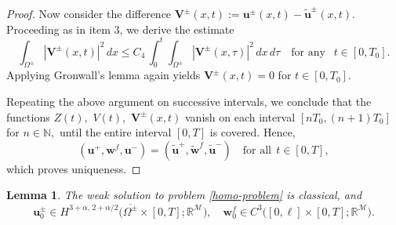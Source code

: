 \documentclass[reqno]{amsart}            %
\newtheorem{lemma}{Lemma}[section]
\numberwithin{equation}{section}
\begin{document}
\begin{proof}
		Now consider the difference
		$
		\mathbf{V}^\pm(x,t):= \mathbf{u}^\pm(x,t) - \tilde{\mathbf{u}}^\pm(x,t). 
		$
		Proceeding as in item 3, we derive the estimate
		\begin{equation*}%
			\int_{\Omega^\pm} |\mathbf{V}^\pm(x,t)|^2\, dx \le C_4 \, \int_{0}^{t}\int_{\Omega^\pm} |\mathbf{V}^\pm(x,\tau)|^2 \, dx\, d\tau  \quad \text{for any } \ \ t \in [0,T_0]. 
		\end{equation*}
		Applying Gronwall's lemma again yields   
		$\mathbf{V}^\pm(x,t) =0$ for  $t \in [0, T_0].$
		
		Repeating the above argument on successive intervals, we conclude that the functions $Z(t),$ $V(t),$ $\mathbf{V}^\pm(x,t)$ vanish on each interval $[nT_0, (n+1)T_0]$ for $n \in \mathbb{N},$ until the entire interval $[0,T]$ is covered.
		Hence, 
		$$
		(\mathbf{u}^+, \mathbf{w}^f, \mathbf{u}^-)
		= (\tilde{\mathbf{u}}^+, \tilde{\mathbf{w}}^f, \tilde{\mathbf{u}}^-) \quad \text{for all} \ \ t\in [0,T],
		$$ 
		which proves uniqueness. 
	\end{proof}
	
	\begin{lemma}\label{Th-4-4}
		The weak solution to problem \eqref{homo-problem} is classical, and 
		$$
		\mathbf{u}^\pm_0 \in H^{3+\alpha,\,2+\alpha/2}\big(\overline{\Omega^\pm}\times[0,T]; \mathbb{R}^\mathcal{M} \big),
		\quad  \mathbf{w}^f_0 \in C^{3}\big([0,\ell]\times[0,T]; \mathbb{R}^\mathcal{M}\big).
		$$  
	\end{lemma}
	
\end{document}
